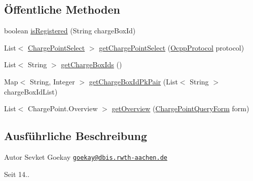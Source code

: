 \subsection*{Öffentliche Methoden}
\begin{DoxyCompactItemize}
\item 
boolean \hyperlink{classde_1_1rwth_1_1idsg_1_1steve_1_1repository_1_1impl_1_1_charge_point_repository_impl_a3339d81256f10707163f9a73c7f98a26}{is\+Registered} (String charge\+Box\+Id)
\item 
List$<$ \hyperlink{classde_1_1rwth_1_1idsg_1_1steve_1_1repository_1_1dto_1_1_charge_point_select}{Charge\+Point\+Select} $>$ \hyperlink{classde_1_1rwth_1_1idsg_1_1steve_1_1repository_1_1impl_1_1_charge_point_repository_impl_a1d92ac9f5e6804fff149aa0d74e33834}{get\+Charge\+Point\+Select} (\hyperlink{enumde_1_1rwth_1_1idsg_1_1steve_1_1ocpp_1_1_ocpp_protocol}{Ocpp\+Protocol} protocol)
\item 
List$<$ String $>$ \hyperlink{classde_1_1rwth_1_1idsg_1_1steve_1_1repository_1_1impl_1_1_charge_point_repository_impl_a66ae0b99bb08e66ab8747035bdeded2c}{get\+Charge\+Box\+Ids} ()
\item 
Map$<$ String, Integer $>$ \hyperlink{classde_1_1rwth_1_1idsg_1_1steve_1_1repository_1_1impl_1_1_charge_point_repository_impl_a254d8de49274311c0ad2c36fdf0c066e}{get\+Charge\+Box\+Id\+Pk\+Pair} (List$<$ String $>$ charge\+Box\+Id\+List)
\item 
List$<$ Charge\+Point.\+Overview $>$ \hyperlink{classde_1_1rwth_1_1idsg_1_1steve_1_1repository_1_1impl_1_1_charge_point_repository_impl_a0d4d669070321336cd2f330d95164f37}{get\+Overview} (\hyperlink{classde_1_1rwth_1_1idsg_1_1steve_1_1web_1_1dto_1_1_charge_point_query_form}{Charge\+Point\+Query\+Form} form)
\end{DoxyCompactItemize}


\subsection{Ausführliche Beschreibung}
\begin{DoxyAuthor}{Autor}
Sevket Goekay \href{mailto:goekay@dbis.rwth-aachen.de}{\tt goekay@dbis.\+rwth-\/aachen.\+de} 
\end{DoxyAuthor}
\begin{DoxySince}{Seit}
14.. 
\end{DoxySince}


